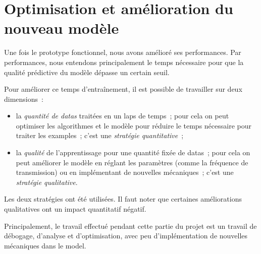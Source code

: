 \section{Optimisation et amélioration du nouveau modèle}

Une fois le prototype fonctionnel, nous avons amélioré ses performances.
Par performances, nous entendons principalement le temps nécessaire pour que la qualité prédictive du modèle dépasse un certain seuil.

Pour améliorer ce temps d'entraînement, il est possible de travailler sur deux dimensions~:
\begin{itemize}
	\item la \emph{quantité de \glspl{data}} traitées en un laps de temps~;
	pour cela on peut optimiser les algorithmes et le modèle pour réduire le temps nécessaire pour traiter les \glspl{example}~;
	c'est une \emph{stratégie quantitative}~;
	\item la \emph{qualité} de l'apprentissage pour une quantité fixée de \glspl{data}~;
	pour cela on peut améliorer le modèle en réglant les paramètres (comme la fréquence de transmission) ou en implémentant de nouvelles mécaniques~;
	c'est une \emph{stratégie qualitative}.
\end{itemize}

Les deux stratégies ont été utilisées. Il faut noter que certaines améliorations qualitatives ont un impact quantitatif négatif.

Principalement, le travail effectué pendant cette partie du projet est un travail de débogage, d'analyse et d'optimisation, avec peu d'implémentation de nouvelles mécaniques dans le \gls{model}.


